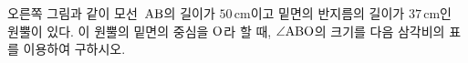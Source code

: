 \noindent\begin{minipage}[t]{0.58\linewidth}\vspace{0pt}\raggedright 오른쪽 그림과 같이 모선~$\mathrm{AB}$의 길이가 $50\,\mathrm{cm}$이고 밑면의 반지름의 길이가 $37\,\mathrm{cm}$인 원뿔이 있다. 이 원뿔의 밑면의 중심을 $\mathrm{O}$라 할 때, $\angle\mathrm{ABO}$의 크기를 다음 삼각비의 표를 이용하여 구하시오.\end{minipage}\hfill\begin{minipage}[t]{0.4\linewidth}\vspace{0pt}\centering \resizebox{\ifdim\width>\linewidth\linewidth\else\width\fi}{!}{}\end{minipage}\par
\par\smallskip\begin{center}\resizebox{\ifdim\width>\linewidth\linewidth\else\width\fi}{!}{}\end{center}
